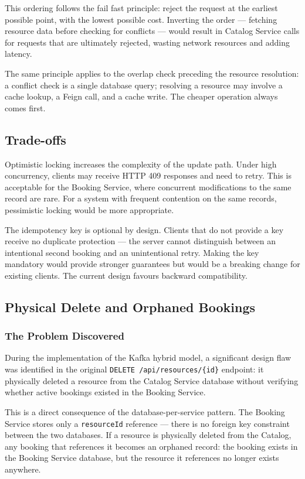 This ordering follows the fail fast principle: reject the request at the earliest possible point, with the lowest possible cost. Inverting the order --- fetching resource data before checking for conflicts --- would result in Catalog Service calls for requests that are ultimately rejected, wasting network resources and adding latency.

The same principle applies to the overlap check preceding the resource resolution: a conflict check is a single database query; resolving a resource may involve a cache lookup, a Feign call, and a cache write. The cheaper operation always comes first.

\subsection{Trade-offs}

Optimistic locking increases the complexity of the update path. Under high concurrency, clients may receive HTTP 409 responses and need to retry. This is acceptable for the Booking Service, where concurrent modifications to the same record are rare. For a system with frequent contention on the same records, pessimistic locking would be more appropriate.

The idempotency key is optional by design. Clients that do not provide a key receive no duplicate protection --- the server cannot distinguish between an intentional second booking and an unintentional retry. Making the key mandatory would provide stronger guarantees but would be a breaking change for existing clients. The current design favours backward compatibility.

\subsection{Physical Delete and Orphaned Bookings}

\subsubsection{The Problem Discovered}

During the implementation of the Kafka hybrid model, a significant design flaw was identified in the original \texttt{DELETE /api/resources/\{id\}} endpoint: it physically deleted a resource from the Catalog Service database without verifying whether active bookings existed in the Booking Service.

This is a direct consequence of the database-per-service pattern. The Booking Service stores only a \texttt{resourceId} reference --- there is no foreign key constraint between the two databases. If a resource is physically deleted from the Catalog, any booking that references it becomes an orphaned record: the booking exists in the Booking Service database, but the resource it references no longer exists anywhere.

